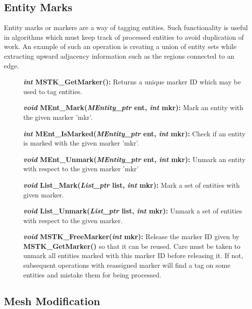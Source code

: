 \documentclass[12pt]{article}
\begin{document}
\newpage
\subsection{Entity Marks}

Entity marks or markers are a way of tagging entities. Such
functionality is useful in algorithms which must keep track of
processed entities to avoid duplication of work. An example of such an
operation is creating a union of entity sets while extracting upward
adjacency information such as the regions connected to an edge.

\begin{description}
\item[]\textbf{\textit{int} MSTK\_GetMarker():} Returns a unique marker ID
which may be used to tag entities.

\item[]\textbf{\textit{void} MEnt\_Mark(\textit{MEntity\_ptr} ent, \textit{int} mkr):} Mark an entity with the given marker 'mkr'.

\item[]\textbf{\textit{int} MEnt\_IsMarked(\textit{MEntity\_ptr} ent, \textit{int} mkr):} Check if an entity is marked with the given marker 'mkr'.

\item[]\textbf{\textit{void} MEnt\_Unmark(\textit{MEntity\_ptr} ent, \textit{int} mkr):} Unmark an entity with respect to the given marker 'mkr'

\item[]\textbf{\textit{void} List\_Mark(\textit{List\_ptr} list, \textit{int} mkr):} Mark a set of entities with given marker.

\item[]\textbf{\textit{void} List\_Unmark(\textit{List\_ptr} list, \textit{int} mkr):}
Unmark a set of entities with respect to the given marker.

\item[]\textbf{\textit{void} MSTK\_FreeMarker(\textit{int} mkr):} Release the
marker ID given by \textbf{MSTK\_GetMarker()} so that it can be
reused. Care must be taken to unmark all entities marked with this
marker ID before releasing it. If not, subsequent operations with
reassigned marker will find a tag on some entities and mistake them
for being processed.
\end{description}




\newpage
\subsection{Mesh Modification}
\end{document}
